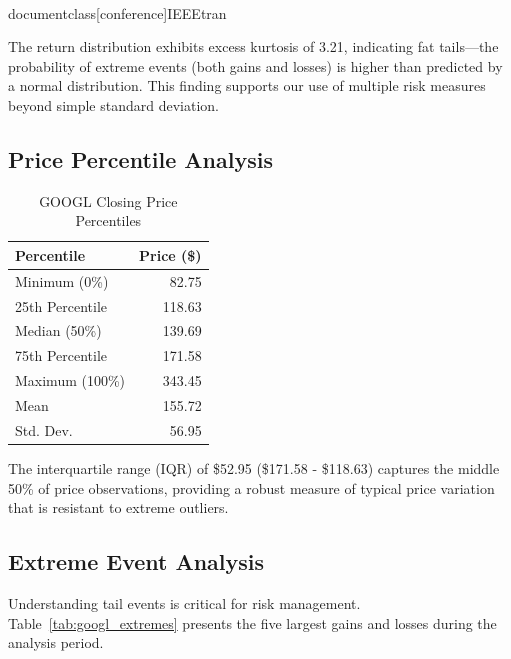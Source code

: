 \\documentclass[conference]{IEEEtran}
\begin{document}
The return distribution exhibits excess kurtosis of 3.21, indicating fat tails---the probability of extreme events (both gains and losses) is higher than predicted by a normal distribution. This finding supports our use of multiple risk measures beyond simple standard deviation.

\subsection{Price Percentile Analysis}

\begin{table}[H]
\caption{GOOGL Closing Price Percentiles}
\begin{center}
\begin{tabular}{|l|r|}
\hline
\textbf{Percentile} & \textbf{Price (\$)} \\
\hline
Minimum (0\%) & 82.75 \\
\hline
25th Percentile & 118.63 \\
\hline
Median (50\%) & 139.69 \\
\hline
75th Percentile & 171.58 \\
\hline
Maximum (100\%) & 343.45 \\
\hline
Mean & 155.72 \\
\hline
Std. Dev. & 56.95 \\
\hline
\end{tabular}
\label{tab:googl_price_percentiles}
\end{center}
\end{table}

The interquartile range (IQR) of \$52.95 (\$171.58 - \$118.63) captures the middle 50\% of price observations, providing a robust measure of typical price variation that is resistant to extreme outliers.

\subsection{Extreme Event Analysis}

Understanding tail events is critical for risk management. Table~\ref{tab:googl_extremes} presents the five largest gains and losses during the analysis period.
\end{document}
